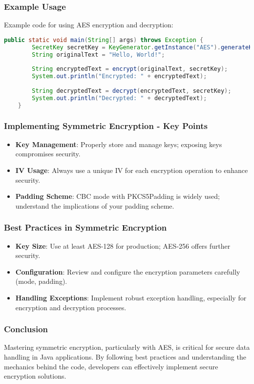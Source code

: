 \documentclass{beamer}
\begin{document}
\begin{frame}[fragile]
    \frametitle{Example Usage}
    Example code for using AES encryption and decryption:
    \begin{lstlisting}[language=java]
    public static void main(String[] args) throws Exception {
        SecretKey secretKey = KeyGenerator.getInstance("AES").generateKey();
        String originalText = "Hello, World!";
        
        String encryptedText = encrypt(originalText, secretKey);
        System.out.println("Encrypted: " + encryptedText);
        
        String decryptedText = decrypt(encryptedText, secretKey);
        System.out.println("Decrypted: " + decryptedText);
    }
    \end{lstlisting}
\end{frame}

\begin{frame}[fragile]
    \frametitle{Implementing Symmetric Encryption - Key Points}
    \begin{itemize}
        \item \textbf{Key Management}: Properly store and manage keys; exposing keys compromises security.
        \item \textbf{IV Usage}: Always use a unique IV for each encryption operation to enhance security.
        \item \textbf{Padding Scheme}: CBC mode with PKCS5Padding is widely used; understand the implications of your padding scheme.
    \end{itemize}
\end{frame}

\begin{frame}[fragile]
    \frametitle{Best Practices in Symmetric Encryption}
    \begin{itemize}
        \item \textbf{Key Size}: Use at least AES-128 for production; AES-256 offers further security.
        \item \textbf{Configuration}: Review and configure the encryption parameters carefully (mode, padding).
        \item \textbf{Handling Exceptions}: Implement robust exception handling, especially for encryption and decryption processes.
    \end{itemize}
\end{frame}

\begin{frame}[fragile]
    \frametitle{Conclusion}
    Mastering symmetric encryption, particularly with AES, is critical for secure data handling in Java applications. By following best practices and understanding the mechanics behind the code, developers can effectively implement secure encryption solutions.
\end{frame}
\end{document}
